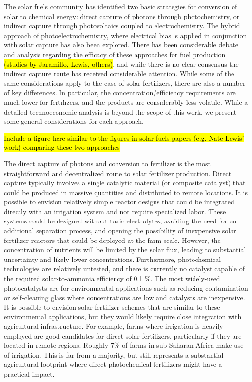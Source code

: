 The solar fuels community has identified two basic strategies for conversion of solar to chemical energy: direct capture of photons through photochemistry, or indirect capture through photovoltaics coupled to electrochemistry.\cite{McDaniel_2010,Highfield_2015} The hybrid approach of photoelectrochemistry, where electrical bias is applied in conjunction with solar capture has also been explored. There has been considerable debate and analysis regarding the efficacy of these approaches for fuel production \hl{(studies by Jaramillo, Lewis, others)}, and while there is no clear consensus the indirect capture route has received considerable attention. While some of the same considerations apply to the case of solar fertilizers, there are also a number of key differences. In particular, the concentration/efficiency requirements are much lower for fertilizers, and the products are considerably less volatile. While a detailed technoeconomic analysis is beyond the scope of this work, we present some general considerations for each approach.

\hl{Include a figure here similar to the figures in solar fuels papers (e.g. Nate Lewis' work) comparing these two approaches}

The direct capture of photons and conversion to fertilizer is the most straightforward and decentralized route to solar fertilizer production. Direct capture typically involves a single catalytic material (or composite catalyst) that could be produced in massive quantities and distributed to remote locations. It is possible to envision relatively simple reactor designs that could be integrated directly with an irrigation system and not require specialized labor. These systems could be designed without toxic electrolytes, avoiding the need for an additional separation process, and opening the possibility of inexpensive solar fertilizer reactors that could be deployed at the farm scale. However, the concentration of nutrients will be limited by the solar flux, leading to substantial uncertainty and likely lower concentrations. Furthermore, photochemical technologies are relatively untested, and there is currently no catalyst capable of the required solar-to-ammonia efficiency of 0.1 \%. The most widely-used photocatalysts are for environmental applications such as reducing contamination or self-cleaning glass where concentrations are low and catalysts are inexpensive. It is possible to envision solar fertilizer schemes that are similar to these environmental applications, but they would likely require close integration with agricultural infrastructure. For example, farms where irrigation is heavily employed are good candidates for direct solar fertilizers, particularly if they are located in remote regions. Roughly 7\% of farms in sub-Saharan Africa make use of irrigation. This is far from a majority, but still represents a substantial agricultural footprint where direct photochemical fertilizers might have a practical impact.

